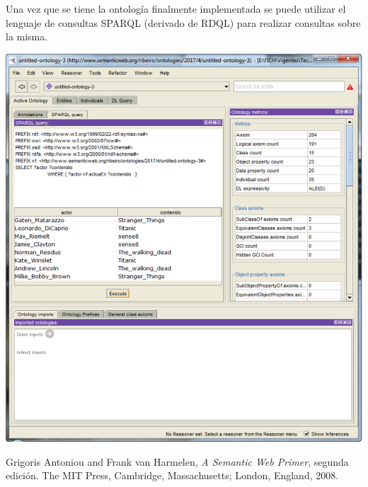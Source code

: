 \documentclass[a4paper,10pt,spanish,oneside]{article}
\begin{document}
\begin{minipage}{0.3\linewidth}

Una vez que se tiene la ontología finalmente implementada se puede utilizar el lenguaje de consultas SPARQL (derivado de RDQL) para realizar consultas sobre la misma.

\end{minipage} \hfill \begin{minipage}{0.65\linewidth}

\begin{center}
\includegraphics[width=\linewidth]{8}
\end{center}

\end{minipage}

\begin{thebibliography}{99}
Grigoris Antoniou and Frank van Harmelen,
\emph{A Semantic Web Primer}, segunda edición.
The MIT Press, Cambridge, Massachusetts; London, England,
2008.
\end{thebibliography}
\end{document}
